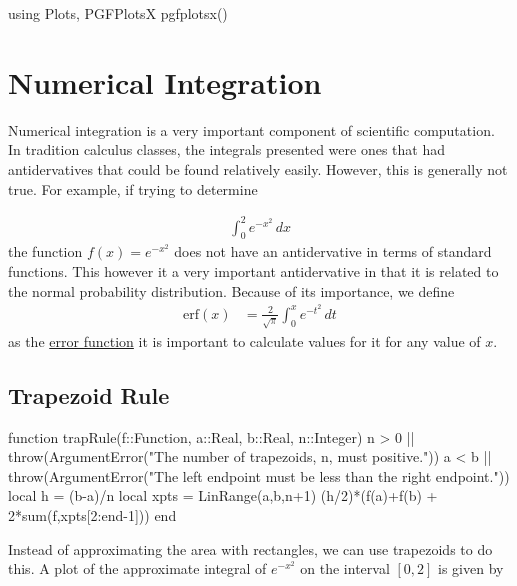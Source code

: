 
\begin{jlcode}[numint]
using Plots, PGFPlotsX
pgfplotsx()
\end{jlcode}

\chapter{Numerical Integration} \label{ch:num-int}

Numerical integration is a very important component of scientific computation.  In tradition calculus classes, the integrals presented were ones that had antidervatives that could be found relatively easily.  However, this is generally not true.  For example, if trying to determine

\begin{align*}
\int_0^{2} e^{-x^2} \, dx 
\end{align*}
%
the function $f(x)=e^{-x^2}$ does not have an antidervative in terms of standard functions.  This however it a very important antidervative in that it is related to the normal probability distribution.  Because of its importance, we define
\begin{align*}
\text{erf}(x) & = \frac{2}{\sqrt{\pi}} \int_0^x e^{-t^2} \, dt 
\end{align*}
as the \href{https://en.wikipedia.org/wiki/Error_function}{error function} it is important to calculate values for it for any value of $x$.  

\section{Trapezoid Rule}

\begin{jlcode}[numint]
function trapRule(f::Function, a::Real, b::Real, n::Integer)
  n > 0 || throw(ArgumentError("The number of trapezoids, n, must positive."))
  a < b || throw(ArgumentError("The left endpoint must be less than the right endpoint."))
  local h = (b-a)/n
  local xpts = LinRange(a,b,n+1)
  (h/2)*(f(a)+f(b) + 2*sum(f,xpts[2:end-1]))
end
\end{jlcode}



Instead of approximating the area with rectangles, we can use trapezoids to do this.  A plot of the approximate integral of $e^{-x^2}$ on the interval $[0,2]$ is given by

